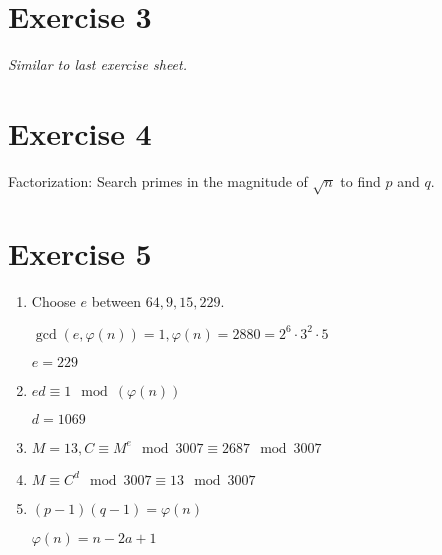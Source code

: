 \documentclass[a4paper]{scrreprt}
\begin{document}
\section*{Exercise 3}

\textit{Similar to last exercise sheet.}

\section*{Exercise 4}

Factorization: Search primes in the magnitude of $\sqrt{n}$ to find $p$ and $q$.

\section*{Exercise 5}

\begin{enumerate}
    \item Choose $e$ between ${64,9,15,229}$.

        $\gcd(e,\varphi(n))=1, \varphi(n)=2880=2^6\cdot3^2\cdot5$

        $e=229$
    \item $ed\equiv1\mod(\varphi(n))$
        
        $d=1069$
    \item $M=13, C\equiv M^e\mod3007\equiv2687\mod3007$
    \item $M\equiv C^d\mod3007\equiv13\mod 3007$
    \item $(p-1)(q-1)=\varphi(n)$

        $\varphi(n)=n-2a+1$
\end{enumerate}
\end{document}
